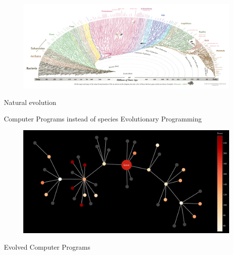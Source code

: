 \documentclass[aspectratio=169]{beamer}
\makeatletter
\renewcommand{\emph}[1]{{\Huge \color{pureminimalistic@text@red} #1}}
\newcommand{\red}[1]{{\color{pureminimalistic@text@red} #1}}
\makeatother
\begin{document}
{
\begin{frame}[plain]
  \begin{figure}
  \centering
  \includegraphics[width=1.0\linewidth,keepaspectratio]{figures/tree_of_life.png}
  \end{figure}
  \begin{center}
      \emph{Natural evolution}
  \end{center}
\end{frame}
}

\begin{frame}[plain]{}
  \centering
  \vfill
  \red{\fontsize{40}{50}\selectfont Computer Programs instead of species}
  \vfill
  \Huge Evolutionary Programming
\end{frame}

\begin{frame}[plain]
  \begin{figure}
  \centering
  \includegraphics[width=1.0\linewidth,keepaspectratio]{figures/unlabeled_tree.pdf}
  \end{figure}
  \begin{center}
  \emph{Evolved Computer Programs}
  \end{center}
\end{frame}
\end{document}
